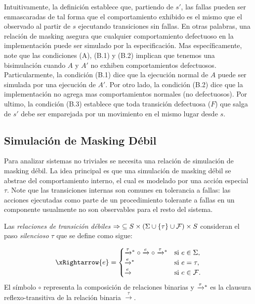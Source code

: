  Intuitivamente, la definición establece que, partiendo de $s'$, las fallas pueden ser enmascaradas de tal forma que el comportamiento exhibido es el mismo que el observado al partir de $s$ ejecutando transiciones sin fallas. 
 En otras palabras, una relación de masking asegura que cualquier comportamiento defectuoso en la implementación puede ser simulado por la especificación. Mas específicamente, note que las condiciones (A), (B.1) y (B.2) implican que tenemos una bisimulación cuando $A$ y $A'$ no exhiben comportamientos defectuosos.
Particularmente, la condición (B.1) dice que la ejecución normal de $A$ puede ser simulada por una ejecución de $A'$. Por otro lado, la condición (B.2) dice que la implementación no agrega mas comportamientos normales (no defectuosos). Por ultimo, la condición (B.3) establece que toda transición defectuosa ($F$) que salga de $s'$ debe ser emparejada por un movimiento en el mismo lugar desde $s$.

\subsection{Simulación de Masking Débil}

Para analizar sistemas no triviales se necesita una relación de simulación de masking débil. La idea principal es que una simulación de masking débil se abstrae del comportamiento interno, el cual es modelado por una acción especial $\tau$. Note que las transiciones internas son comunes en tolerancia a fallas: las acciones ejecutadas como parte de un procedimiento tolerante a fallas en un componente usualmente no son observables para el resto del sistema.

Las \textit{relaciones de transición débiles} ${\Rightarrow} \subseteq S
\times (\Sigma \cup \{\tau\} \cup \mathcal{F}) \times S$ consideran el paso \emph{silencioso} $\tau$ que se define como sigue: 

\[
\xRightarrow{e} = 
       \begin{cases}
            \xrightarrowstar{\tau} \circ \xrightarrow{e} \circ \xrightarrowstar{\tau} & 
            \text{si } e \in \Sigma,  \\ 
            \xrightarrowstar{e} & \text{si } e = \tau,  \\
            \xrightarrow{e} & \text{si } e \in \Faults.\\
       \end{cases}
\]
%
El símbolo $\circ$ representa la composición de relaciones binarias y $\mathrel{{\xrightarrow[]{\tau}}{}^*}$ es la clausura reflexo-transitiva de la relación binaria $\xrightarrow{\tau}$. 

